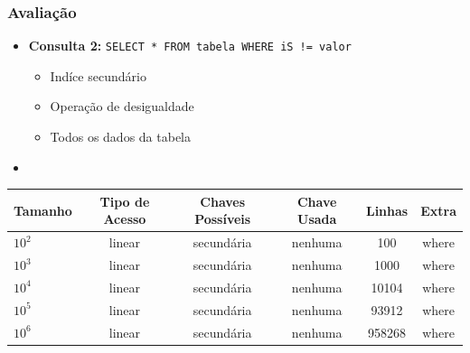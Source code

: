 \documentclass[10pt]{beamer}
\begin{document}
\begin{frame}[fragile]
  \frametitle{Avaliação}

    \begin{itemize}
      \item \textbf{Consulta 2: } \texttt{SELECT * FROM tabela WHERE iS != valor}
      \begin{itemize}
        \item[-] Indíce secundário
        \item[-] Operação de desigualdade
        \item[-] Todos os dados da tabela
      \end{itemize}

      \item[\ ] \ 

    \end{itemize}

     \begin{table}[!htb]
    \footnotesize
    \centering
    \begin{tabular}{lccccc}
      \toprule
      \textbf{Tamanho} & \textbf{Tipo de Acesso}  & \textbf{Chaves Possíveis}  & \textbf{Chave Usada} & \textbf{Linhas} & \textbf{Extra}  \\
      \midrule
      $10^2$  & linear  &  secundária  & nenhuma  & 100     & where  \\
      $10^3$  & linear  &  secundária  & nenhuma  & 1000    & where  \\
      $10^4$  & linear  &  secundária  & nenhuma  & 10104   & where  \\
      $10^5$  & linear  &  secundária  & nenhuma  & 93912   & where  \\
      $10^6$  & linear  &  secundária  & nenhuma  & 958268  & where  \\

      \bottomrule
    \end{tabular}
    \end{table}

   

\end{frame}
\end{document}
